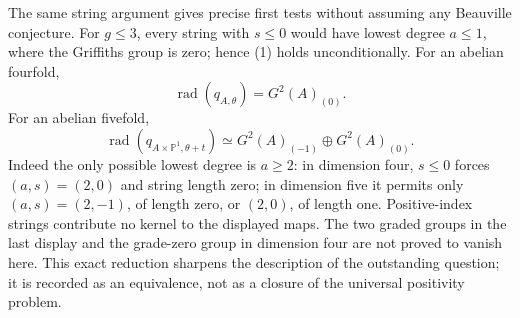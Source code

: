 The same string argument gives precise first tests without assuming
any Beauville conjecture. For $g\le3$, every string with $s\le0$
would have lowest degree $a\le1$, where the Griffiths group is zero;
hence (1) holds unconditionally. For an abelian fourfold,
\[
 \operatorname{rad}(q_{A,\theta})=G^2(A)_{(0)}.
\]
For an abelian fivefold,
\[
 \operatorname{rad}(q_{A\times\mathbb P^1,\theta+t})
       \simeq G^2(A)_{(-1)}\oplus G^2(A)_{(0)}.
\]
Indeed the only possible lowest degree is $a\ge2$: in dimension
four, $s\le0$ forces $(a,s)=(2,0)$ and string length zero; in
dimension five it permits only $(a,s)=(2,-1)$, of length zero,
or $(2,0)$, of length one. Positive-index strings contribute no
kernel to the displayed maps. The two graded groups in the last
display and the grade-zero group in dimension four are not proved
to vanish here. This exact reduction sharpens the description of
the outstanding question; it is recorded as an equivalence, not as
a closure of the universal positivity problem.
